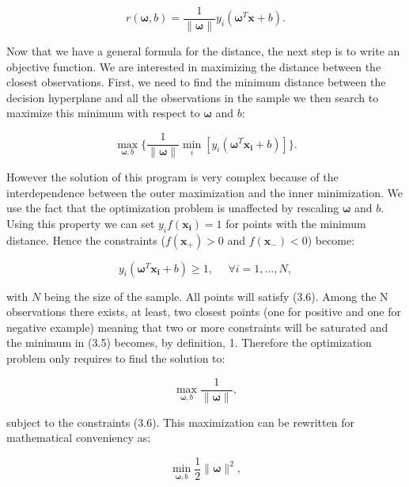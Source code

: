 \documentclass[a4paper,12pt]{article}
\numberwithin{equation}{section}
\begin{document}
\begin{equation}\label{eq:4}
r(\boldsymbol{\omega}, b) = \frac{1}{\|\boldsymbol{\omega}\|}y_i(\boldsymbol{\omega}^T\boldsymbol{x}+b).
\end{equation}

Now that we have a general formula for the distance, the next step is to write an objective function. We are interested in maximizing the distance between the closest observations. First, we need to find the minimum distance between the decision hyperplane and all the observations in the sample we then search to maximize this minimum with respect to $\boldsymbol{\omega}$ and $b$:

\begin{equation}\label{eq:5}
\max_{\boldsymbol{\omega},b}\{\frac{1}{\|\boldsymbol{\omega}\|}\min_{i}[y_i(\boldsymbol{\omega}^T\boldsymbol{x_i}+b)]\}.
\end{equation} 


However the solution of this program is very complex because of the interdependence between the outer maximization and the inner minimization. We use the fact that the optimization problem is unaffected by rescaling $\boldsymbol{\omega}$ and $b$. Using this property we can set $y_if(\boldsymbol{x_i}) = 1$ for points with the minimum distance. Hence the constraints ($f(\boldsymbol{x_+}) > 0 $ and $f(\boldsymbol{x_-}) < 0 $) become:

\begin{equation}\label{eq:6}
y_i(\boldsymbol{\omega}^T\boldsymbol{x_i}+b) \geq 1, \mbox{ } \mbox{ } \forall i = 1,\dots,N ,
\end{equation}

\noindent
with $N$ being the size of the sample. All points will satisfy (3.6). Among the N observations there exists, at least, two closest points (one for positive and one for negative example) meaning that two or more constraints will be saturated and the minimum in (3.5) becomes, by definition, 1. Therefore the optimization problem only requires to find the solution to:

\begin{equation*}
\max_{\boldsymbol{\omega},b}\frac{1}{\|\boldsymbol{\omega}\|},
\end{equation*}

\noindent
subject to the constraints (3.6). This maximization can be rewritten for mathematical conveniency as:

\begin{equation}\label{eq:7}
\min_{\boldsymbol{\omega},b}\frac{1}{2}\|\boldsymbol{\omega}\|^2,
\end{equation}
\end{document}
